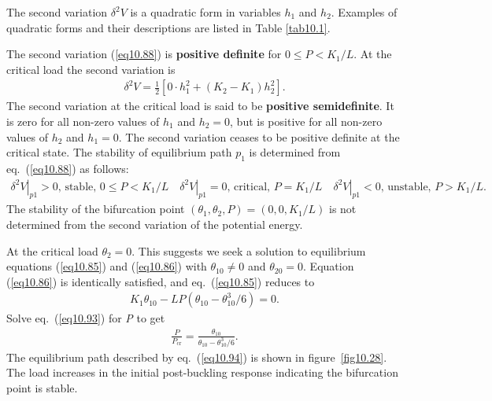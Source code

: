 \documentclass{AeroStructure-ERJohnson}
\begin{document}
The second variation $\delta^{2} V$ is a quadratic form in variables $h_1$ and $h_2$. Examples of quadratic forms and their descriptions are listed in Table \ref{tab10.1}.

\begin{table}[h]
\vspace*{-13pt}
\end{table}

The second variation (\ref{eq10.88}) is \textbf{positive definite} for $0 \leq P<K_{1} / L$. At the critical load the second variation is
\begin{align}\label{eq10.91}
\delta^{2} V=\frac{1}{2}\left[0 \cdot h_{1}^{2}+\left(K_{2}-K_{1}\right) h_{2}^{2}\right].
\end{align}
The second variation at the critical load is said to be \textbf{positive semidefinite}. It is zero for all non-zero values of $h_1$ and $h_2 = 0$, but is positive for all non-zero values of $h_2$ and $h_1 = 0$. The second variation ceases to be positive definite at the critical state. The stability of equilibrium path $p_{1}$ is determined from eq.~(\ref{eq10.88}) as follows:
\begin{align}\label{eq10.92}
\left.\delta^{2} V\right|_{p 1}>0 \text {, stable, } 0 \leq P<K_{1} /\left.L \quad \delta^{2} V\right|_{p 1}=0 \text {, critical, } P=K_{1} /\left.L \quad \delta^{2} V\right|_{p 1}<0 \text {, unstable, } P>K_{1} / L.
\end{align}
The stability of the bifurcation point $\left(\theta_{1}, \theta_{2}, P\right)=\left(0,0, K_{1} / L\right)$ is not determined from the second variation of the potential energy.

At the critical load $\theta_{2}=0$. This suggests we seek a solution to equilibrium equations (\ref{eq10.85}) and (\ref{eq10.86}) with $\theta_{10} \neq 0$ and $\theta_{20}=0$. Equation (\ref{eq10.86}) is identically satisfied, and eq.~(\ref{eq10.85}) reduces to
\begin{align}\label{eq10.93}
K_{1} \theta_{10}-L P(\theta_{10}-\theta_{10}^{3} / 6)=0.
\end{align}
Solve eq.~(\ref{eq10.93}) for \textit{P} to get
\begin{align}\label{eq10.94}
\frac{P}{P_{\mathrm{cr}}}=\frac{\theta_{10}}{\theta_{10}-\theta_{10}^{3} / 6}.
\end{align}
The equilibrium path described by eq.~(\ref{eq10.94}) is shown in figure~\ref{fig10.28}. The load increases in the initial post-buckling response indicating the bifurcation point is stable.
\end{document}
